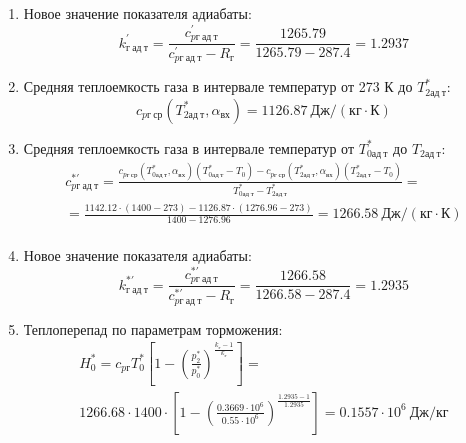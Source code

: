 \documentclass[a4paper,10pt]{article}
\begin{document}
\begin{enumerate}
        \item Новое значение показателя адиабаты:
        \[
            k_{г\ ад\ т}^\prime = \frac{c_{pг\ ад\ т}^\prime}{c_{pг\ ад\ т}^\prime - R_г} =
                \frac{
                    1265.79
                }{
                    1265.79 - 287.4
                }
            = 1.2937
        \]

        \item Средняя теплоемкость газа в интервале температур от 273 К до $T_{2ад\ т}^*$:
        \[
            c_{pг\ ср} (T_{2ад\ т}^*, \alpha_{вх}) =
            1126.87 \ Дж/(кг \cdot К)
        \]

        \item Средняя теплоемкость газа в интервале температур от $T_{0ад\ т}^*$ до $T_{2ад\ т}$:
        \begin{gather*}
            c_{pг\ ад\ т}^{*\prime} = \frac{
		        c_{pг\ ср}(T_{0ад\ т}^*, \alpha_{вх}) (T_{0ад\ т}^* - T_0) - c_{pг\ ср}(T_{2ад\ т}^*, \alpha_{вх}) (T_{2ад\ т}^* - T_0)
		    }{
		        T_{0ад\ т}^* - T_{2ад\ т}^*} =\\
            =\frac{
		        1142.12 \cdot
                (1400 - 273) -
		        1126.87 \cdot
                (1276.96 - 273)
		    }{
		        1400 - 1276.96} =
		    1266.58 \ Дж / (кг \cdot К)\\
        \end{gather*}

        \item Новое значение показателя адиабаты:
        \[
            k_{г\ ад\ т}^{*\prime} = \frac{c_{pг\ ад\ т}^{*\prime}}{c_{pг\ ад\ т}^{*\prime} - R_г} =
                \frac{
                    1266.58
                }{
                    1266.58 - 287.4
                }
            = 1.2935
        \]

        \item Теплоперепад по параметрам торможения:
        \begin{gather*}
            H_0^* = c_{pг} T_0^* \left[
                        1 - \left(
                                \frac{p_2^*}{p_0^*}
                            \right) ^
                        \frac{k_г - 1}{k_г}
                    \right] =\\
            1266.68 \cdot 1400 \cdot
                    \left[
                        1 - \left(
                                \frac{
                                    0.3669 \cdot 10^6
                                }{
                                    0.55 \cdot 10^6
                                }
                            \right) ^
                        \frac{1.2935 - 1}{1.2935}
                    \right]
            = 0.1557 \cdot 10^6 \ Дж/кг\\
        \end{gather*}


\end{enumerate}
\end{document}

